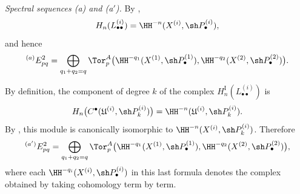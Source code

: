 \begin{env}[6.6.3]
\label{III.6.6.3}
\emph{Spectral sequences \textnormal{(a)} and
\textnormal{(a$'$)}.}
By ,
\[
  H_n(L_{\bullet\bullet}^{(i)})
  =
  \HH^{-n}(X^{(i)},\sh P_\bullet^{(i)}),
\]
and hence
\[
  {}^{(a)}E_{pq}^2
  =
  \bigoplus_{q_1+q_2=q}
  \Tor_p^A
  \bigl(
    \HH^{-q_1}(X^{(1)},\sh P_\bullet^{(1)}),
    \HH^{-q_2}(X^{(2)},\sh P_\bullet^{(2)})
  \bigr).
\]

By definition, the component of degree $k$ of the complex
$H_n^{\mathrm I}(L_{\bullet\bullet}^{(i)})$ is
\[
  H_n\bigl(
    C^\bullet(\mathfrak U^{(i)},\sh P_k^{(i)})
  \bigr)
  =
  \HH^{-n}(\mathfrak U^{(i)},\sh P_k^{(i)}).
\]
By , this module is canonically isomorphic to
$\HH^{-n}(X^{(i)},\sh P_k^{(i)})$.  Therefore
\[
  {}^{(a')}E_{pq}^2
  =
  \bigoplus_{q_1+q_2=q}
  \Tor_p^A
  \bigl(
    \HH^{-q_1}(X^{(1)},\sh P_\bullet^{(1)}),
    \HH^{-q_2}(X^{(2)},\sh P_\bullet^{(2)})
  \bigr),
\]
where each $\HH^{-q_i}(X^{(i)},\sh P_\bullet^{(i)})$ in this
last formula denotes the complex obtained by taking cohomology
term by term.
\end{env}

